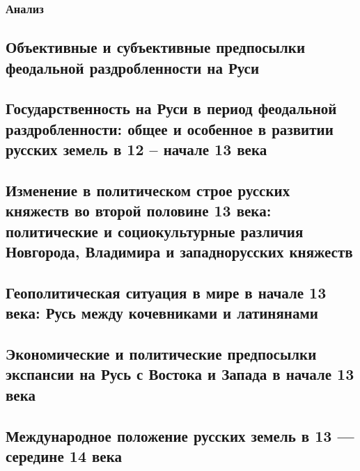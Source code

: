\documentclass{article}
\begin{document}
\subsubsection{Анализ}

\subsection{Объективные и субъективные предпосылки феодальной раздробленности на Руси}

\subsection{Государственность на Руси в период феодальной раздробленности: общее и особенное в развитии русских земель в 12 – начале 13 века}

\subsection{Изменение в политическом строе русских княжеств во второй половине 13 века: политические и социокультурные различия Новгорода, Владимира и западнорусских княжеств}

\subsection{Геополитическая ситуация в мире в начале 13 века: Русь между кочевниками и латинянами}

\subsection{Экономические и политические предпосылки экспансии на Русь с Востока и Запада в начале 13 века}

\subsection{Международное положение русских земель в 13 — середине 14 века}
\end{document}

